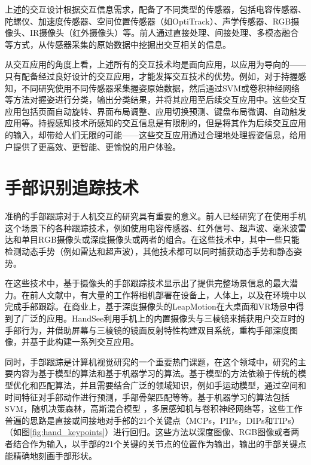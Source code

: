 上述的交互设计根据交互信息需求，配备了不同类型的传感器，包括电容传感器、陀螺仪、加速度传感器、空间位置传感器（如OptiTrack）、声学传感器、RGB摄像头、IR摄像头（红外摄像头）等。前人通过直接处理、间接处理、多模态融合等方式，从传感器采集的原始数据中挖掘出交互相关的信息。

从交互应用的角度上看，上述所有的交互技术均是面向应用，以应用为导向的——只有配备经过良好设计的交互应用，才能发挥交互技术的优势。例如，对于持握感知，不同研究使用不同传感器采集握姿原始数据，然后通过SVM或卷积神经网络等方法对握姿进行分类，输出分类结果，并将其应用至后续交互应用中。这些交互应用包括页面自动旋转、界面布局调整、应用切换预测、键盘布局微调、自动触发应用等。持握感知技术所感知的交互信息是有限制的，但是将其作为后续交互应用的输入，却带给人们无限的可能——这些交互应用通过合理地处理握姿信息，给用户提供了更高效、更智能、更愉悦的用户体验。


\section{手部识别追踪技术}

准确的手部跟踪对于人机交互的研究具有重要的意义。前人已经研究了在使用手机这个场景下的各种跟踪技术，例如使用电容传感器\cite{le2018infinitouch}、红外信号\cite{han2005low}、超声波\cite{Nanayakkara:2013:EFI:2459236.2459240}、毫米波雷达\cite{Lien:2016:SUG:2897824.2925953}和单目RGB摄像头\cite{Mullender:1993:DS(:302430}或深度摄像头\cite{Sharp:2015:ARF:2702123.2702179}或两者的组合。在这些技术中，其中一些只能检测动态手势（例如雷达和超声波），其他技术都可以同时捕获动态手势和静态姿势。

在这些技术中，基于摄像头的手部跟踪技术显示出了提供完整场景信息的最大潜力。在前人文献中，有大量的工作将相机部署在设备\cite{Chen:2014:AIT:2642918.2647392}\cite{Sridhar:2017:WAI:3025453.3026005}上，人体\cite{Chan:2015:CEW:2807442.2807450}\cite{Kim:2012:DFI:2380116.2380139}\cite{Mistry:2009:SWG:1667146.1667160}上，以及在环境\cite{Sharp:2015:ARF:2702123.2702179}中以完成手部跟踪。在商业上，基于深度摄像头的LeapMotion在大桌面和VR场景中得到了广泛的应用。HandSee\cite{Yu:2019:HEF:3290605.3300935}利用手机上的内置摄像头与三棱镜来捕获用户交互时的手部行为，并借助屏幕与三棱镜的镜面反射特性构建双目系统，重构手部深度图像，并基于此构建一系列交互应用。

同时，手部跟踪是计算机视觉研究的一个重要热门课题，在这个领域中，研究的主要内容为基于模型的算法和基于机器学习的算法。基于模型的方法依赖于传统的模型优化和匹配算法，并且需要结合广泛的领域知识，例如手运动模型\cite{tang2015sampling_optimization}\cite{xu2016articulated}，通过空间和时间特征对手部动作进行预测\cite{sinha2016robust_hand}，手部骨架匹配\cite{de2008model}等等。基于机器学习的算法包括SVM\cite{RealtimeHO_ECCV2016}，随机决策森林\cite{5995316}，高斯混合模型 \cite{Sridhar2016}，多层感知机与卷积神经网络\cite{Zimmermann2017}\cite{Yuan2017}等，这些工作普遍的思路是直接或间接地对手部的21个关键点（MCPs，PIPs，DIPs和TIPs）\cite{DBLP:journals/corr/YuanYSJK17}（如图\ref{fig:hand_keypoints}）进行回归。这些方法以深度图像、RGB图像或者两者结合作为输入，以手部的21个关键的关节点的位置作为输出，输出的手部关键点能精确地刻画手部形状。

